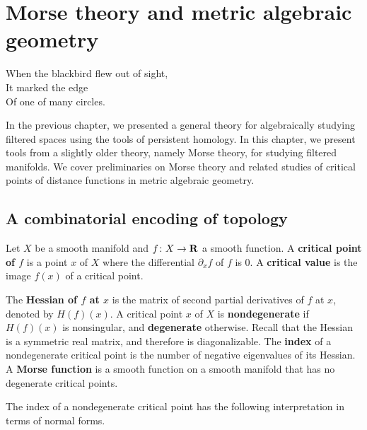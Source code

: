 
\chapter{Morse theory and metric algebraic geometry}
\label{C:metric-morse}

\begin{epigraph}
  When the blackbird flew out of sight, \\
  It marked the edge \\
  Of one of many circles.
\end{epigraph}

In the previous chapter, we presented a general theory for algebraically studying filtered spaces using the tools of persistent homology. In this chapter, we present tools from a slightly older theory, namely Morse theory, for studying filtered manifolds. We cover preliminaries on Morse theory and related studies of critical points of distance functions in metric algebraic geometry.

\section{A combinatorial encoding of topology}
\label{S:Morse-theory}

\begin{definition}
  Let $X$ be a smooth manifold and $f \colon X \to \mathbf{R}$ a smooth function. A \textbf{critical point of $f$} is a point $x$ of $X$ where the differential $\partial_x f$ of $f$ is $0$. A \textbf{critical value} is the image $f(x)$ of a critical point.
  
  The \textbf{Hessian of $f$ at $x$} is the matrix of second partial derivatives of $f$ at $x$, denoted by $H(f)(x)$. A critical point $x$ of $X$ is \textbf{nondegenerate} if $H(f)(x)$ is nonsingular, and \textbf{degenerate} otherwise.
  Recall that the Hessian is a symmetric real matrix, and therefore is diagonalizable. The \textbf{index} of a nondegenerate critical point is the number of negative eigenvalues of its Hessian.
  A \textbf{Morse function} is a smooth function on a smooth manifold that has no degenerate critical points.
\end{definition}

The index of a nondegenerate critical point has the following interpretation in terms of normal forms.

